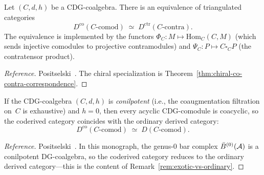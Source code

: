 \begin{theorem}
\label{thm:co-contra-correspondence-appendix}
Let $(C, d, h)$ be a CDG-coalgebra.  There is an equivalence of
triangulated categories
\begin{equation}\label{eq:co-contra-equivalence}
D^{\mathrm{co}}(C\text{-}\mathrm{comod})
\;\simeq\;
D^{\mathrm{ctr}}(C\text{-}\mathrm{contra}).
\end{equation}
The equivalence is implemented by the functors
$\Phi_C \colon M \mapsto \mathrm{Hom}_C(C, M)$ \textup{(}which
sends injective comodules to projective contramodules\textup{)}
and $\Psi_C \colon P \mapsto C \square_C P$ \textup{(}the
contratensor product\textup{)}.
\end{theorem}

\begin{proof}[Reference]
Positselski~\cite[Theorem~5.3]{Positselski11}.  The chiral
specialization is Theorem~\ref{thm:chiral-co-contra-correspondence}.
\end{proof}

\begin{theorem}
\label{thm:conilpotent-reduction}
If the CDG-coalgebra $(C, d, h)$ is \emph{conilpotent}
\textup{(}i.e., the coaugmentation filtration on~$C$ is
exhaustive\textup{)} and $h = 0$, then every acyclic
CDG-comodule is coacyclic, so the coderived category coincides
with the ordinary derived category:
\begin{equation}\label{eq:conilpotent-reduction}
D^{\mathrm{co}}(C\text{-}\mathrm{comod})
\;\simeq\;
D(C\text{-}\mathrm{comod}).
\end{equation}
\end{theorem}

\begin{proof}[Reference]
Positselski~\cite[Corollary~4.4]{Positselski11}.  In this
monograph, the genus-$0$ bar complex
$\bar{B}^{(0)}(\mathcal{A})$ is a conilpotent DG-coalgebra, so
the coderived category reduces to the ordinary derived
category---this is the content of
Remark~\textup{\ref{rem:exotic-vs-ordinary}}.
\end{proof}

